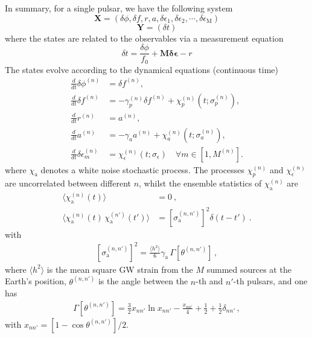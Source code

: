 \documentclass[]{scrartcl}
\begin{document}
In summary, for a single pulsar, we have the following system
\begin{equation}
	\boldsymbol{X} = \left(\delta \phi, \delta f, r,a,\delta \epsilon_1, \delta \epsilon_2, \cdots, \delta \epsilon_{\mathrm M} \right)
\end{equation}
\begin{equation}
	\boldsymbol{Y} = \left(\delta t \right)
\end{equation}
where the states are related to the observables via a measurement equation
\begin{equation}
	\delta t = \frac{\delta \phi}{f_0} + \mathbf{M} \mathbf{\delta \epsilon} - r
\end{equation}
The states evolve according to the dynamical equations (continuous time)
\begin{align}
	\frac{d}{dt} \delta \phi^{(n)} &= \delta f^{(n)}, \\
	\frac{d}{dt} \delta f^{(n)} &= -\gamma_p^{(n)} \delta f^{(n)} + \chi_p^{(n)}(t;\sigma_p^{(n)}), \\
	\frac{d}{dt} r^{(n)} &= a^{(n)}, \\
	\frac{d}{dt} a^{(n)} &= -\gamma_a a^{(n)} + \chi_a^{(n)}(t;\sigma_a^{(n)}), \\
	\frac{d}{dt} \delta \epsilon^{(n)}_{m} &= \chi_\epsilon^{(n)}(t;\sigma_\epsilon) \quad \forall m \in [1, M^{(n)}].
\end{align}
where $\chi_{\mathrm a}$ denotes a white noise stochastic process. The processes  $\chi_p^{(n)}$ and  $\chi_\epsilon^{(n)}$ are uncorrelated between different $n$, whilst the ensemble statistics of $\chi_{\mathrm a}^{(n)}$ are
\begin{align}
	\langle \chi^{(n)}_{\mathrm a}(t) \rangle &= 0 \ , 	\label{eq:xieqn1} \\
	\langle \chi^{(n)}_{\mathrm a}(t) \, \chi^{(n')}_{\mathrm a}(t') \rangle &= \left[\sigma^{(n,n')}_{\mathrm a}\right]^2 \delta(t - t') \ .	\label{eq:xieqn2}
\end{align}
with
\begin{eqnarray}
	\left[\sigma^{(n,n')}_{\mathrm a}\right]^2 = \frac{\langle h^2\rangle}{6} \gamma_{\mathrm a} \, \Gamma \left[ \theta^{(n,n')} \right] \, , \label{eq:sigma_a_expression}
\end{eqnarray}
where $\langle h^2 \rangle$ is the mean square GW strain from the $M$ summed sources at the Earth's position, $\theta^{(n,n')}$ is the angle between the $n$-th and $n'$-th pulsars, and one has
\begin{eqnarray}
	\Gamma\left[\theta^{(n,n')} \right] =  \frac{3}{2} x_{n n'} \ln x_{n n'}  -\frac{x_{n n'} }{4}+\frac{1}{2} + \frac{1}{2} \delta_{n n'}\label{eq:correlation} \, ,
\end{eqnarray}
with $x_{nn'} = \left[1 - \cos \theta^{(n,n')}\right]/2$. \newline 
\end{document}
